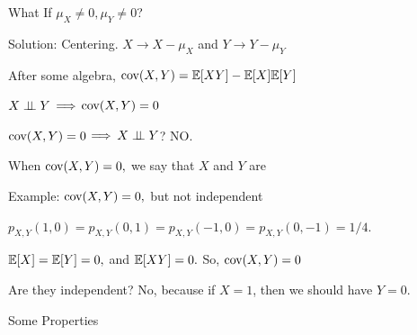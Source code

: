 \documentclass[fleqn,aspectratio=169]{beamer}
\begin{document}
\begin{frame}{What If $\mu_X \neq 0, \mu_Y \neq 0$?}

\plitemsep 0.1in

\bci 

\item<2-> Solution: Centering. $X \rightarrow X - \mu_X$ and $Y \rightarrow Y-\mu_Y$

\item<4-> After some algebra, $\text{cov}( X,Y ) = \mathbb{E}[ XY ] - \mathbb{E}[ X ]\mathbb{E}[ Y ]$

\item<5-> $X \perp \!\!\! \perp Y$ $\Longrightarrow$ $\text{cov}( X,Y )=0$

\item<6-> $\text{cov}( X,Y )=0$ $\Longrightarrow$ $X \perp \!\!\! \perp Y$? NO.

\item<7-> When $\text{cov}( X,Y )=0,$ we say that $X$ and $Y$ are 

\eci

\end{frame}

\begin{frame}{Example: $\text{cov}( X,Y )=0,$ but not independent}

\plitemsep 0.1in

\bci 

\item $p_{X,Y}(1,0) = p_{X,Y}(0,1) = p_{X,Y}(-1,0) = p_{X,Y}(0,-1) = 1/4.$

\item<2-> $\mathbb{E}[ X ] = \mathbb{E}[ Y ]=0,$ and $\mathbb{E}[ XY ]=0.$ So, $\text{cov}( X,Y )=0$

\item<3-> Are they independent? No, because if $X=1$, then we should have $Y=0.$

\eci
\centering
{}
\end{frame}

\begin{frame}{Some Properties}

\plitemsep 0.07in

\vspace{-0.3in}
\bci []

\item<2-> 

\item<3-> 

\item<4->  

\item<5-> 
\eci

\end{frame}
\end{document}
